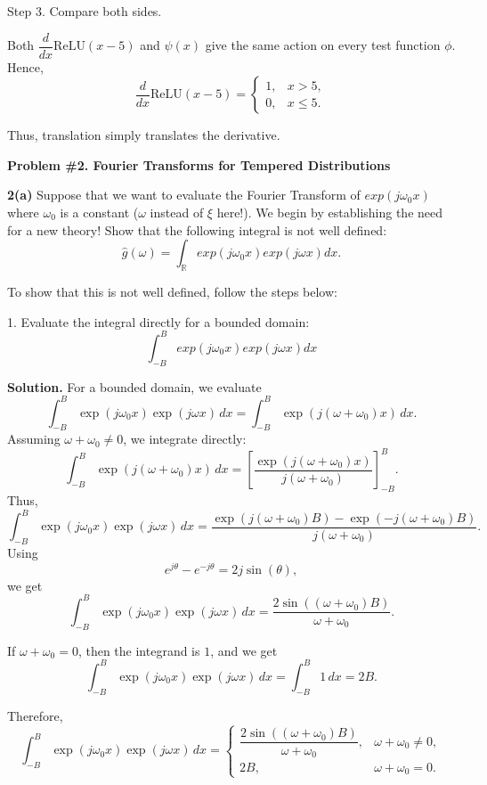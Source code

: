 \documentclass[11pt]{article}
\begin{document}
	Step 3. Compare both sides.
	
	Both \(\dfrac{d}{dx}\mathrm{ReLU}(x-5)\) and \(\psi(x)\) give the same action on every test function \(\phi\). Hence,
	\[
	\frac{d}{dx}\mathrm{ReLU}(x-5)
	=
	\begin{cases}
		1, & x>5,\\
		0, & x\le 5.
	\end{cases}
	\]
	
	Thus, translation simply translates the derivative.
	
	\newpage
	
	\textbf{Problem \#2. Fourier Transforms for Tempered Distributions}
	
	\vspace{0.5em}
	
	\textbf{2(a)} Suppose that we want to evaluate the Fourier Transform of $exp(j\omega_0 x)$ where $\omega_0$ is a constant ($\omega$ instead of $\xi$ here!). We begin by establishing the need for a new theory! Show that the following integral is not well defined:
	\[
	\hat{g}(\omega) = \int_{\mathbb{R}} exp(j\omega_0 x) exp(j\omega x) dx.
	\]
	
	To show that this is not well defined, follow the steps below:
	
	1. Evaluate the integral directly for a bounded domain:
	\[
	\int_{-B}^{B} exp(j\omega_0 x) exp(j\omega x) dx
	\]
	
	\textbf{Solution.}
	For a bounded domain, we evaluate
	\[
	\int_{-B}^{B} \exp(j\omega_0 x)\exp(j\omega x)\,dx
	=
	\int_{-B}^{B}\exp\!\left(j(\omega+\omega_0)x\right)\,dx.
	\]
	Assuming \(\omega+\omega_0 \neq 0\), we integrate directly:
	\[
	\int_{-B}^{B}\exp\!\left(j(\omega+\omega_0)x\right)\,dx
	=
	\left[
	\frac{\exp\!\left(j(\omega+\omega_0)x\right)}{j(\omega+\omega_0)}
	\right]_{-B}^{B}.
	\]
	Thus,
	\[
	\int_{-B}^{B}\exp(j\omega_0 x)\exp(j\omega x)\,dx
	=
	\frac{\exp\!\left(j(\omega+\omega_0)B\right)-\exp\!\left(-j(\omega+\omega_0)B\right)}{j(\omega+\omega_0)}.
	\]
	Using
	\[
	e^{j\theta}-e^{-j\theta}=2j\sin(\theta),
	\]
	we get
	\[
	\int_{-B}^{B}\exp(j\omega_0 x)\exp(j\omega x)\,dx
	=
	\frac{2\sin\!\left((\omega+\omega_0)B\right)}{\omega+\omega_0}.
	\]
	
	If \(\omega+\omega_0=0\), then the integrand is \(1\), and we get
	\[
	\int_{-B}^{B}\exp(j\omega_0 x)\exp(j\omega x)\,dx
	=
	\int_{-B}^{B}1\,dx
	=
	2B.
	\]
	
	Therefore,
	\[
	\int_{-B}^{B}\exp(j\omega_0 x)\exp(j\omega x)\,dx
	=
	\begin{cases}
		\dfrac{2\sin\!\left((\omega+\omega_0)B\right)}{\omega+\omega_0}, & \omega+\omega_0\neq 0, \\[1.2ex]
		2B, & \omega+\omega_0=0.
	\end{cases}
	\]
	
\end{document}
